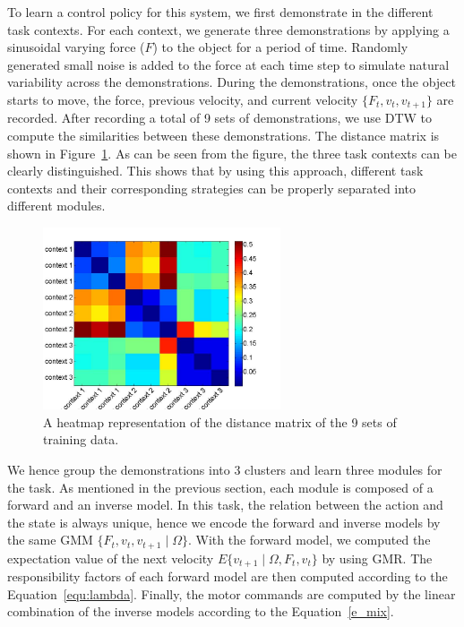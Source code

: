
To learn a control policy for this system, we first demonstrate in the
different task contexts. For each context, we generate three
demonstrations by applying a sinusoidal varying force ($F$) to the
object for a period of time. Randomly generated small noise is added
to the force at each time step to simulate natural variability across
the demonstrations. During the demonstrations, once the object starts
to move, the force, previous velocity, and current velocity $\{F_t,
v_t, v_{t+1}\}$ are recorded. After recording a total of  9 sets of demonstrations, we use DTW to compute the similarities between these demonstrations. The distance matrix is shown in Figure~\ref{fig:heatmap_sim}. As can be seen from the figure, the three task contexts can be clearly distinguished. This shows that by using this approach, different task contexts and their corresponding strategies can be properly separated into different modules.

\begin{figure}
  \centering
  \includegraphics[width=7cm]{./fig/contexts.jpg}
  \caption{ \scriptsize{A heatmap representation of the distance
      matrix of the 9 sets of training data.}
}
\label{fig:heatmap_sim}
\end{figure}

We hence group the demonstrations into 3 clusters and learn three modules for the task. As mentioned in the previous section, each module is composed of a forward and an inverse model. In this task, the relation between the action and the state is always unique, hence we encode the forward and inverse models by the same GMM $\{F_t, v_t, v_{t+1}\mid \Omega\}$. With the forward model, we computed the expectation value of the next velocity $E\{v_{t+1}\mid \Omega,F_t,v_t\}$ by using GMR. The responsibility factors of each forward model are then computed according to the Equation~\ref{equ:lambda}. Finally, the motor commands are computed by the linear combination of the inverse models according to the Equation~\ref{e_mix}.

